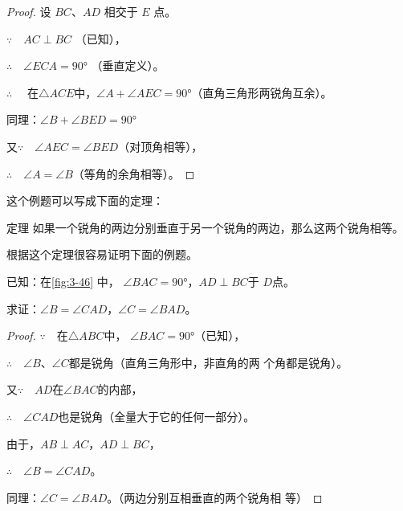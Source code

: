 \begin{proof}
设 $BC$、$AD$ 相交于 $E$ 点。

$\because\quad AC\perp BC$  （已知），

$\therefore\quad \angle ECA=\ang{90}$ （垂直定义）。

$\therefore\quad$ 在$\triangle ACE$中，$\angle A+\angle AEC=\ang{90}$（直角三角形两锐角互余）。

同理：$\angle B+\angle BED=\ang{90}$

又$\because\quad \angle AEC=\angle BED$（对顶角相等），

$\therefore\quad \angle A=\angle B$（等角的余角相等）。
\end{proof}
这个例题可以写成下面的定理：

\begin{Theorem}{定理} 
如果一个锐角的两边分别垂直于另一个锐角的两边，那么这两个锐角相等。 
\end{Theorem}

根据这个定理很容易证明下面的例题。

\begin{example}
已知：在\cref{fig:3-46} 中，
$\angle BAC=\ang{90}$，$AD\perp BC$于
$D$点。

求证：$\angle B=\angle CAD$，$\angle C=\angle BAD$。
\end{example}


\begin{proof}
$\because\quad $在$\triangle ABC$中，
$\angle BAC=\ang{90}$（已知），

$\therefore\quad \angle B$、$\angle C$都是锐角（直角三角形中，非直角的两
个角都是锐角）。

又$\because\quad AD$在$\angle BAC$的内部，

$\therefore\quad \angle CAD$也是锐角（全量大于它的任何一部分）。

由于，$AB\perp AC$，$AD\perp BC$，

$\therefore\quad \angle B=\angle CAD$。

同理：$\angle C=\angle BAD$。（两边分别互相垂直的两个锐角相
等）
\end{proof}

